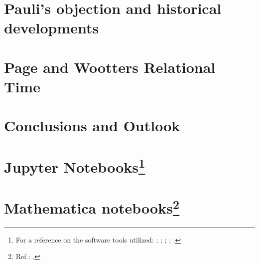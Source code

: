 \chapter{Pauli's objection and historical developments}\label{ch:hist}






\chapter{Page and Wootters Relational Time}\label{ch:pw}\label{ch:detect}












\chapter{Conclusions and Outlook}\label{ch:outlook}




\appendix

\chapter[Jupyter Notebooks]{Jupyter Notebooks\footnote{
  For a reference on the software tools utilized:
  \cite{comp:scipy};
  \cite{comp:sympy};
  \cite{comp:jupyter};
  \cite{comp:matplotlib};
  \cite{comp:numpy}.
}}






\chapter[Mathematica notebooks]{Mathematica notebooks\footnote{
  Ref.: \cite{Wolfram}.
}}



\printbibliography[heading=bibintoc]


